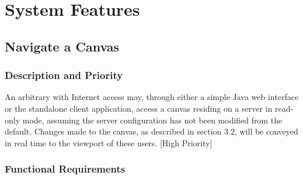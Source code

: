\documentclass[11pt,oneside,a4paper]{article}
\begin{document}
\section{System Features}
\subsection{Navigate a Canvas}
\subsubsection{Description and Priority}
An arbitrary with Internet access may, through either a simple Java web interface or the standalone client application, access a canvas residing on a server in read-only mode, assuming the server configuration has not been modified from the default. Changes made to the canvas, as described in section 3.2, will be conveyed in real time to the viewport of these users.
[High Priority]
\subsubsection{Functional Requirements}
\end{document}
